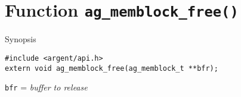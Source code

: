 \section{Function \texttt{ag\_memblock\_free()}}
  \begin{bclogo}[logo=\bccrayon, noborder=true, barre=snake, couleurBarre=gray]
    {Synopsis}
  \lstset{style=SYNOPSIS}
  \begin{lstlisting}[linewidth=1.0\linewidth]
#include <argent/api.h>
extern void ag_memblock_free(ag_memblock_t **bfr);
  \end{lstlisting}
  \scriptsize
  \texttt{bfr} = \emph{buffer to release} \\
  \end{bclogo}

